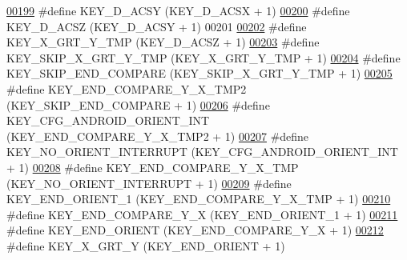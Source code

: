 \begin{DoxyCode}
\hypertarget{dmp_key_8h_source.tex_l00199}{}\hyperlink{dmp_key_8h_a8369f23b6e35faeb0a046ef3d9e3ce7d}{00199} \textcolor{preprocessor}{#define KEY\_D\_ACSY                  (KEY\_D\_ACSX + 1)}
\hypertarget{dmp_key_8h_source.tex_l00200}{}\hyperlink{dmp_key_8h_a831073a12eb6af4bd0e26a0295b93535}{00200} \textcolor{preprocessor}{#define KEY\_D\_ACSZ                  (KEY\_D\_ACSY + 1)}
00201 
\hypertarget{dmp_key_8h_source.tex_l00202}{}\hyperlink{dmp_key_8h_a186843904fb6bda544ba733ff7803f7b}{00202} \textcolor{preprocessor}{#define KEY\_X\_GRT\_Y\_TMP             (KEY\_D\_ACSZ + 1)}
\hypertarget{dmp_key_8h_source.tex_l00203}{}\hyperlink{dmp_key_8h_aadef1338ea6db9da1dd57dca58b22780}{00203} \textcolor{preprocessor}{#define KEY\_SKIP\_X\_GRT\_Y\_TMP        (KEY\_X\_GRT\_Y\_TMP + 1)}
\hypertarget{dmp_key_8h_source.tex_l00204}{}\hyperlink{dmp_key_8h_ab86fb35f9751e04aa23835026c12bc2d}{00204} \textcolor{preprocessor}{#define KEY\_SKIP\_END\_COMPARE        (KEY\_SKIP\_X\_GRT\_Y\_TMP + 1)}
\hypertarget{dmp_key_8h_source.tex_l00205}{}\hyperlink{dmp_key_8h_a868972f8a262529b22eb381e136db38e}{00205} \textcolor{preprocessor}{#define KEY\_END\_COMPARE\_Y\_X\_TMP2    (KEY\_SKIP\_END\_COMPARE + 1)}
\hypertarget{dmp_key_8h_source.tex_l00206}{}\hyperlink{dmp_key_8h_af70b2e42ca4a7ba6595f038d0d129bf6}{00206} \textcolor{preprocessor}{#define KEY\_CFG\_ANDROID\_ORIENT\_INT  (KEY\_END\_COMPARE\_Y\_X\_TMP2 + 1)}
\hypertarget{dmp_key_8h_source.tex_l00207}{}\hyperlink{dmp_key_8h_a49fee5f045566542c31528c9d1635f32}{00207} \textcolor{preprocessor}{#define KEY\_NO\_ORIENT\_INTERRUPT     (KEY\_CFG\_ANDROID\_ORIENT\_INT + 1)}
\hypertarget{dmp_key_8h_source.tex_l00208}{}\hyperlink{dmp_key_8h_abe47fcf029cbd3e4c755b66b647a31e6}{00208} \textcolor{preprocessor}{#define KEY\_END\_COMPARE\_Y\_X\_TMP     (KEY\_NO\_ORIENT\_INTERRUPT + 1)}
\hypertarget{dmp_key_8h_source.tex_l00209}{}\hyperlink{dmp_key_8h_a9820d8f168cbb46606169ab66a2f2800}{00209} \textcolor{preprocessor}{#define KEY\_END\_ORIENT\_1            (KEY\_END\_COMPARE\_Y\_X\_TMP + 1)}
\hypertarget{dmp_key_8h_source.tex_l00210}{}\hyperlink{dmp_key_8h_afd623a534dace67adcd728ad56171565}{00210} \textcolor{preprocessor}{#define KEY\_END\_COMPARE\_Y\_X         (KEY\_END\_ORIENT\_1 + 1)}
\hypertarget{dmp_key_8h_source.tex_l00211}{}\hyperlink{dmp_key_8h_a8677f7b8360e93ac183cd343a2fe13e7}{00211} \textcolor{preprocessor}{#define KEY\_END\_ORIENT              (KEY\_END\_COMPARE\_Y\_X + 1)}
\hypertarget{dmp_key_8h_source.tex_l00212}{}\hyperlink{dmp_key_8h_a83a4c32ff31709bd76843a480e04ff3a}{00212} \textcolor{preprocessor}{#define KEY\_X\_GRT\_Y                 (KEY\_END\_ORIENT + 1)}

\end{DoxyCode}
